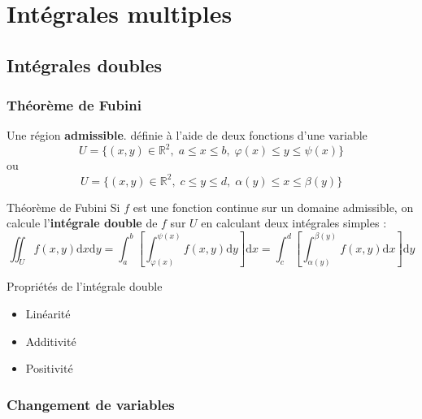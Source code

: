 \chapter{Intégrales multiples} %
\label{chap:Intégrales multiples}

\section{Intégrales doubles} %

\subsection{Théorème de Fubini} %
\label{sub:Théorème de Fubini}

Une région \textbf{admissible}. définie à l'aide de deux fonctions d'une variable 
\begin{equation}
  U = \{(x, y) \in \mathbb{R}^{2}, \;a \le x \le b, \;\varphi(x) \le y \le \psi(x)\}
\end{equation}
ou
\begin{equation}
  U = \{(x, y) \in \mathbb{R}^{2}, \;c \le y \le d, \;\alpha(y) \le x \le \beta(y)\}
\end{equation}
\begin{Theorem}{
    Théorème de Fubini
  }{}
Si $f$ est une fonction continue sur un domaine admissible, on calcule l'\textbf{intégrale double} de $f$ sur $U$ en calculant deux intégrales simples : 
\begin{equation}
  \iint _{U} f(x,y) \mathrm{d} x \mathrm{d}y = \int_{a}^{b} \left[\int_{\varphi(x)}^{\psi(x)} f(x,y) \mathrm{d}y\right] \mathrm{d} x = \int_{c}^{d} \left[ \int_{\alpha(y)}^{\beta(y)}f(x,y) \mathrm{d}x\right] \mathrm{d}y
\end{equation}
\end{Theorem}

\begin{Theorem}{Propriétés de l'intégrale double}{}
\begin{itemize}

    \item Linéarité 
    \item Additivité
    \item Positivité

\end{itemize}
\end{Theorem}

\subsection{Changement de variables} %
\label{sub:Changement de variables}

